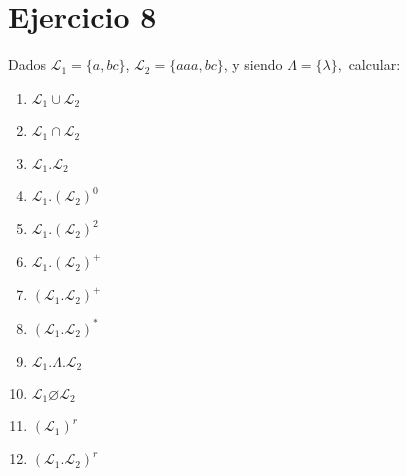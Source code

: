\documentclass{article}
\begin{document}
{{\section*{Ejercicio 8}{Dados $\mathcal{L}_1 = \{a, bc\}$, $\mathcal{L}_2 = \{aaa,bc\}$, y siendo $\Lambda = \{\lambda\},$ calcular:}
\begin{multicols}{4}
\begin{enumerate}[label=\alph*.,font=\itshape]
    \item {$\mathcal{L}_1 \cup \mathcal{L}_2$}
    \item {$\mathcal{L}_1 \cap \mathcal{L}_2$}
    \item {$\mathcal{L}_1 . \mathcal{L}_2$}
    \item {$\mathcal{L}_1 . (\mathcal{L}_2)^0$}
    \item {$\mathcal{L}_1 . (\mathcal{L}_2)^2$}
    \item {$\mathcal{L}_1 . (\mathcal{L}_2)^+$}
    \item {{$(\mathcal{L}_1 . \mathcal{L}_2)^+$}}
    \item {{$(\mathcal{L}_1 . \mathcal{L}_2)^*$}}
    \item {$\mathcal{L}_1 . \Lambda . \mathcal{L}_2$}
    \item {$\mathcal{L}_1 \varnothing \mathcal{L}_2$}
    \item {$(\mathcal{L}_1)^r$}
    \item {$(\mathcal{L}_1 . \mathcal{L}_2)^r$}
\end{enumerate}
\end{multicols}



}}
\end{document}
